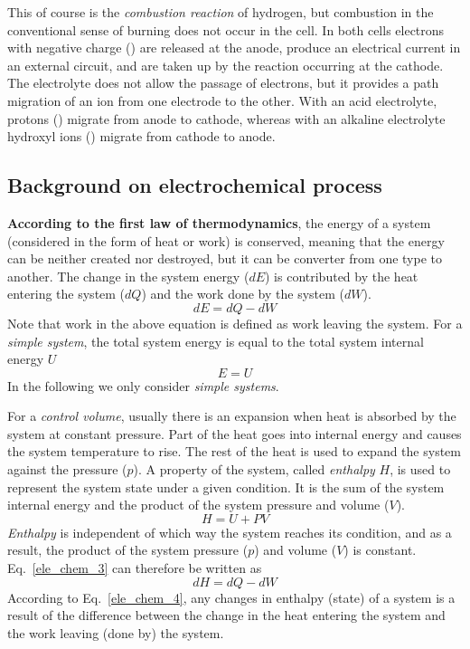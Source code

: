 \documentclass[11pt,a4paper]{article}
\numberwithin{equation}{section}
\theoremstyle{it}
\theoremstyle{definition}
\begin{document}
This of course is the \textit{combustion reaction} of hydrogen, but combustion in the conventional sense of burning does not occur in the cell.
In both cells electrons with negative charge () are released at the anode, produce an electrical current in an external circuit, and are taken up by the reaction occurring at the cathode. The electrolyte does not allow the passage of electrons, but it provides a path migration of an ion from one electrode to the other. With an acid electrolyte, protons () migrate from anode to cathode, whereas with an alkaline electrolyte hydroxyl ions () migrate from cathode to anode.



\subsection{Background on electrochemical process}
\noindent\textbf{According to the first law of thermodynamics}, the energy of a system (considered in the form of heat or work) is conserved, meaning that the energy can be neither created nor destroyed, but it can be converter from one type to another. The change in the system energy ($dE$) is contributed by the heat entering the system ($dQ$) and the work done by the system ($dW$).
\begin{equation}\label{ele_chem_1}
	dE = dQ-dW
\end{equation}
Note that work in the above equation is defined as work leaving the system. For a \textit{simple system}, the total system energy is equal to the total system internal energy $U$
\begin{equation}\label{ele_chem_2}
	E=U
\end{equation}
In the following we only consider \textit{simple systems}.

For a \textit{control volume}, usually there is an expansion when heat is absorbed by the system at constant pressure. Part of the heat goes into internal energy and causes the system temperature to rise. The rest of the heat is used to expand the system against the pressure ($p$). A property of the system, called \textit{enthalpy} $H$, is used to represent the system state under a given condition. It is the sum of the system internal energy and the product of the system pressure and volume ($V$).
\begin{equation}\label{ele_chem_3}
	H = U + PV
\end{equation}
\textit{Enthalpy} is independent of which way the system reaches its condition, and as a result, the product of the system pressure ($p$) and volume ($V$) is constant. Eq.~\eqref{ele_chem_3} can therefore be written as
\begin{equation}\label{ele_chem_4}
	dH = dQ - dW
\end{equation}
According to Eq.~\eqref{ele_chem_4}, any changes in enthalpy (state) of a system is a result of the difference between the change in the heat entering the system and the work leaving (done by) the system.
\end{document}
